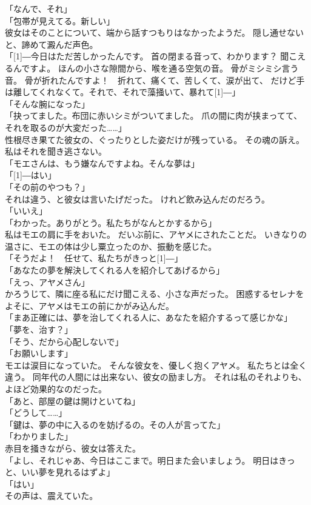 \documentclass[../IHMain]{subfiles}
\begin{document}
「なんで、それ」\\
「包帯が見えてる。新しい」\\
彼女はそのことについて、端から話すつもりはなかったようだ。
隠し通せないと、諦めて澱んだ声色。\\
「\scalebox{3}[1]{―}今日はただ苦しかったんです。
首の閉まる音って、わかります？
聞こえるんですよ。
ほんの小さな隙間から、喉を通る空気の音。
骨がミシミシ言う音。
骨が折れたんですよ！　折れて、痛くて、苦しくて、涙が出て、
だけど手は離してくれなくて。それで、それで藻掻いて、暴れて\scalebox{3}[1]{―}」\\
「そんな腕になった」\\
「抉ってました。布団に赤いシミがついてました。
爪の間に肉が挟まってて、それを取るのが大変だった……」\\
性根尽き果てた彼女の、ぐったりとした姿だけが残っている。
その魂の訴え。
私はそれを聞き逃さない。\\
「モエさんは、もう嫌なんですよね。そんな夢は」\\
「\scalebox{3}[1]{―}はい」\\
「その前のやつも？」\\
それは違う、と彼女は言いたげだった。
けれど飲み込んだのだろう。\\
「いいえ」\\
「わかった。ありがとう。私たちがなんとかするから」\\
私はモエの肩に手をおいた。
だいぶ前に、アヤメにされたことだ。
いきなりの温さに、モエの体は少し粟立ったのか、振動を感じた。\\
「そうだよ！　任せて、私たちがきっと\scalebox{3}[1]{―}」\\
「あなたの夢を解決してくれる人を紹介してあげるから」\\
「えっ、アヤメさん」\\
かろうじて、隣に座る私にだけ聞こえる、小さな声だった。
困惑するセレナをよそに、アヤメはモエの前にかがみ込んだ。\\
「まあ正確には、夢を治してくれる人に、あなたを紹介するって感じかな」\\
「夢を、治す？」\\
「そう、だから心配しないで」\\
「お願いします」\\
モエは涙目になっていた。
そんな彼女を、優しく抱くアヤメ。
私たちとは全く違う。
同年代の人間には出来ない、彼女の励まし方。
それは私のそれよりも、よほど効果的なのだった。\\
「あと、部屋の鍵は開けといてね」\\
「どうして……」\\
「鍵は、夢の中に入るのを妨げるの。その人が言ってた」\\
「わかりました」\\
赤目を掻きながら、彼女は答えた。\\
「よし、それじゃあ、今日はここまで。明日また会いましょう。
明日はきっと、いい夢を見れるはずよ」\\
「はい」\\
その声は、震えていた。\\
\end{document}
